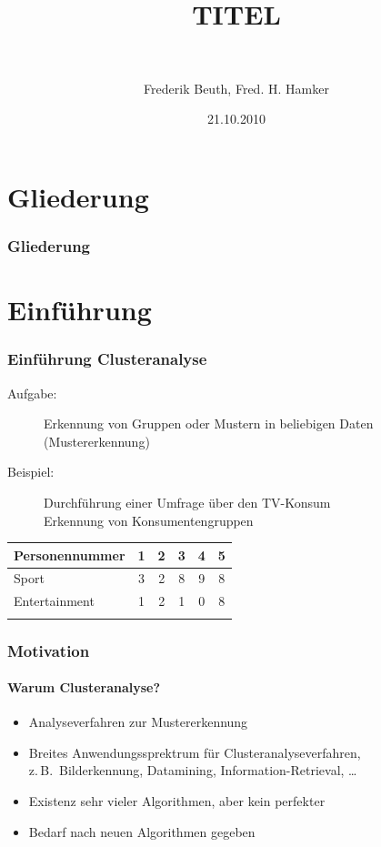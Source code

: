 \documentclass[12pt]{beamer}
\title{TITEL}
\subtitle{~} %
\author{Frederik Beuth, Fred. H. Hamker}
\date{21.10.2010} %
\newcommand{\zb}{z.\,B.~}
\begin{document}

\begin{frame}[plain]
  \titlepage
\end{frame}
%
\section*{Gliederung} 
\begin{frame}
  \frametitle{Gliederung}
  \tableofcontents
\end{frame}
%
\section{Einführung}
%
\begin{frame}
  	\frametitle{Einführung Clusteranalyse}
	\begin{description}

		\item[Aufgabe:]{Erkennung von Gruppen oder Mustern in beliebigen Daten (Mustererkennung)}
		\pause
		\small
		\item[Beispiel:]{Durchführung einer Umfrage über den TV-Konsum\\
			Erkennung von Konsumentengruppen}
	\end{description}
	\begin{minipage}{0.55\textwidth}
		\begin{tabular}{l|c|c|c|c|c}
			Personennummer & 1 & 2 & 3 & 4 & 5 \\
			\hline
			Sport  & 3 & 2 & 8 & 9 & 8 \\
			Entertainment & 1 & 2 & 1 & 0 & 8 \\
			\multicolumn{6}{l}{\hspace{0.5cm}{\small in h pro Woche}}
		\end{tabular}
	\end{minipage}	
\end{frame}
%
\begin{frame}
  \frametitle{Motivation}
  \framesubtitle{Warum Clusteranalyse?}
    \begin{itemize}
	 	 \item Analyseverfahren zur Mustererkennung
	   	 \pause
		 \item Breites Anwendungssprektrum für Clusteranalyseverfahren,\\
			 \zb Bilderkennung, Datamining, Information-Retrieval, \ldots
			\pause 
		 \item Existenz sehr vieler Algorithmen, aber kein perfekter
		 \item Bedarf nach neuen Algorithmen gegeben
  	 \end{itemize}
\end{frame}
\end{document}

